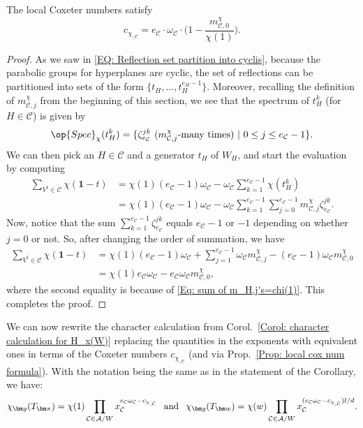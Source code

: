 \begin{prop}\label{Prop: local cox num formula}
The local Coxeter numbers satisfy $$c_{\chi_{,\mathcal{C}}}=e_{\mathcal{C}}\cdot\omega_{\mathcal{C}}\cdot\Big(1-\dfrac{m^{\chi}_{\mathcal{C},0}}{\chi(1)}\Big).$$
\end{prop}
\begin{proof}
As we saw in \eqref{EQ: Reflection set partition into cyclis}, because the parabolic groups for hyperplanes are cyclic, the set of reflections can be partitioned into sets of the form $\{t_H,\ldots,t^{e_H-1}_H\}$. Moreover, recalling the definition of $m^{\chi}_{\mathcal{C},j}$ from the beginning of this section, we see that the spectrum of $t_H^k$ (for $H\in\mathcal{C}$) is given by $$\op{Spec}_{\chi}(t_H^k)=\{ \zeta_{e_{\mathcal{C}}}^{jk}\ (m^{\chi}_{\mathcal{C},j}\text{-many times})\ |\ 0\leq j\leq e_{\mathcal{C}}-1\}.$$ We can then pick an $H\in\mathcal{C}$ and a generator $t_H$ of $W_H$, and start the evaluation by computing \begin{align*}
\sum_{V^t\in\mathcal{C}}\chi(\bm 1-t)&=\chi(1)(e_{\mathcal{C}}-1)\omega_{\mathcal{C}}-\omega_{\mathcal{C}}\sum_{k=1}^{e_{\mathcal{C}}-1}\chi(t_H^k)\\
&=\chi(1)(e_{\mathcal{C}}-1)\omega_{\mathcal{C}}-\omega_{\mathcal{C}}\sum_{k=1}^{e_{\mathcal{C}}-1}\sum_{j=0}^{e_{\mathcal{C}}-1}m^{\chi}_{\mathcal{C},j}\zeta_{e_{\mathcal{C}}}^{jk}.
\end{align*}
Now, notice that the sum $\sum_{k=1}^{e_{\mathcal{C}}-1}\zeta_{e_{\mathcal{C}}}^{jk}$ equals $e_{\mathcal{C}}-1$ or $-1$ depending on whether $j=0$ or not. So, after changing the order of summation, we have \begin{align*}
\sum_{V^t\in\mathcal{C}}\chi(\bm 1-t)&=\chi(1)(e_{\mathcal{C}}-1)\omega_{\mathcal{C}}+\sum_{j=1}^{e_{\mathcal{C}}-1}\omega_{\mathcal{C}}m^{\chi}_{\mathcal{C},j}-(e_{\mathcal{C}}-1)\omega_{\mathcal{C}}m^{\chi}_{\mathcal{C},0}\\
&=\chi(1)e_{\mathcal{C}}\omega_{\mathcal{C}}-e_{\mathcal{C}}\omega_{\mathcal{C}}m^{\chi}_{\mathcal{C},0},
\end{align*}where the second equality is because of \eqref{Eq: sum of m_H,j's=chi(1)}. This completes the proof.
\end{proof}

We can now rewrite the character calculation from Corol.~\ref{Corol: character calculation for H_x(W)} replacing the quantities in the exponents with equivalent ones in terms of the Coxeter numbers $c_{\chi_{,\mathcal{C}}}$ (and via Prop.~\ref{Prop: local cox num formula}). With the notation being the same as in the statement of the Corollary, we have: \begin{equation}
\chi_{\bm y}(T_{\bm \pi})=\chi(1)\prod_{\mathcal{C}\in\mathcal{A}/W}x_{\mathcal{C}}^{e_{\mathcal{C}}\omega_{\mathcal{C}}-c_{\chi_{,\mathcal{C}}}}\hspace{1.5mm}\text{ and }\hspace{1.5mm}\chi_{\bm y}(T_{\bm w})=\chi(w)\prod_{\mathcal{C}\in\mathcal{A}/W}x_{\mathcal{C}}^{(e_{\mathcal{C}}\omega_{\mathcal{C}}-c_{\chi_{,\mathcal{C}}})l/d}.\label{EQ: character values via local Coxeter}\end{equation}

